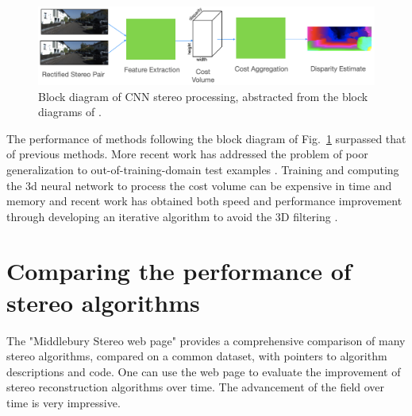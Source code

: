 \begin{figure}
\centerline{
\includegraphics[width=0.8\linewidth]{figures/stereo/stereocnn.jpg}
}
\caption{Block diagram of CNN stereo processing, abstracted from the block diagrams of \cite{Chang2018,Zhang2019GANet,Kendall2017}.}
\label{fig:stereoblock}
\end{figure}

The performance of methods following the block diagram of Fig.~\ref{fig:stereoblock} surpassed that of previous methods.  More recent work has addressed the problem of poor generalization to out-of-training-domain test examples \cite{zhang2019domaininvariant}.  Training and computing the 3d neural network to process the cost volume can be expensive in time and memory and recent work has obtained both speed and performance improvement through developing an iterative algorithm to avoid the 3D filtering \cite{Lipson2021}.


\section{Comparing the performance of stereo algorithms}
The "Middlebury Stereo web page" \cite{Scharstein2002} provides a comprehensive comparison of many stereo algorithms, compared on a common dataset, with pointers to algorithm descriptions and code.  One can use the web page to evaluate the improvement of stereo reconstruction algorithms over time.  The advancement of the field over time is very impressive.


